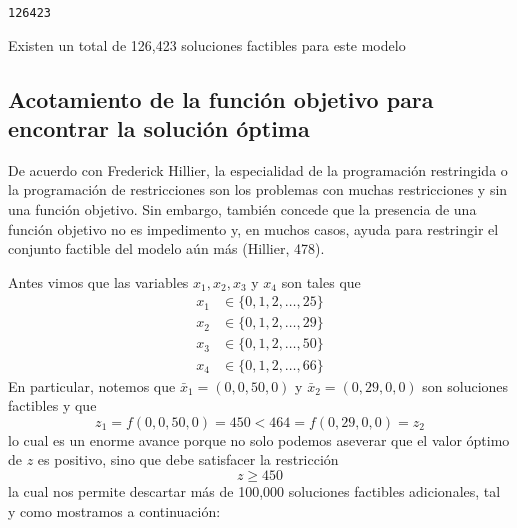 \documentclass[11pt]{article}
\makeatletter
\newcommand{\boxspacing}{\kern\kvtcb@left@rule\kern\kvtcb@boxsep}
\newcommand{\prompt}[4]{
        \ttfamily\llap{{\color{#2}[#3]:\hspace{3pt}#4}}\vspace{-\baselineskip}
    }
\makeatother
\begin{document}
            \begin{tcolorbox}[breakable, size=fbox, boxrule=.5pt, pad at break*=1mm, opacityfill=0]
\prompt{Out}{outcolor}{21}{\boxspacing}
\begin{Verbatim}[commandchars=\\\{\}]
126423
\end{Verbatim}
\end{tcolorbox}
        
    Existen un total de 126,423 soluciones factibles para este modelo

    \hypertarget{acotamiento-de-la-funciuxf3n-objetivo-para-encontrar-la-soluciuxf3n-uxf3ptima}{%
\subsection{Acotamiento de la función objetivo para encontrar la
solución
óptima}\label{acotamiento-de-la-funciuxf3n-objetivo-para-encontrar-la-soluciuxf3n-uxf3ptima}}

    De acuerdo con Frederick Hillier, la especialidad de la programación
restringida o la programación de restricciones son los problemas con
muchas restricciones y sin una función objetivo. Sin embargo, también
concede que la presencia de una función objetivo no es impedimento y, en
muchos casos, ayuda para restringir el conjunto factible del modelo aún
más (Hillier, 478).

Antes vimos que las variables \(x_1, x_2, x_3\) y \(x_4\) son tales que
\begin{align}
    x_1 &\in \{0, 1, 2, \dots, 25\}\\
    x_2 &\in \{0, 1, 2, \dots, 29\}\\
    x_3 &\in \{0, 1, 2, \dots, 50\}\\
    x_4 &\in \{0, 1, 2, \dots, 66\}
\end{align}
En particular, notemos que \(\bar{x}_1 = (0, 0, 50, 0)\) y
\(\bar{x}_2 = (0, 29, 0, 0)\) son soluciones factibles y que
\begin{equation}
z_1 = f(0, 0, 50, 0) = 450 < 464 = f(0, 29, 0, 0) = z_2
\end{equation}
lo cual es un enorme avance porque no solo podemos aseverar que el valor
óptimo de \(z\) es positivo, sino que debe satisfacer la restricción
\begin{equation}
    z \geq 450
\end{equation}
la cual nos permite descartar más de 100,000 soluciones factibles
adicionales, tal y como mostramos a continuación:
\end{document}
